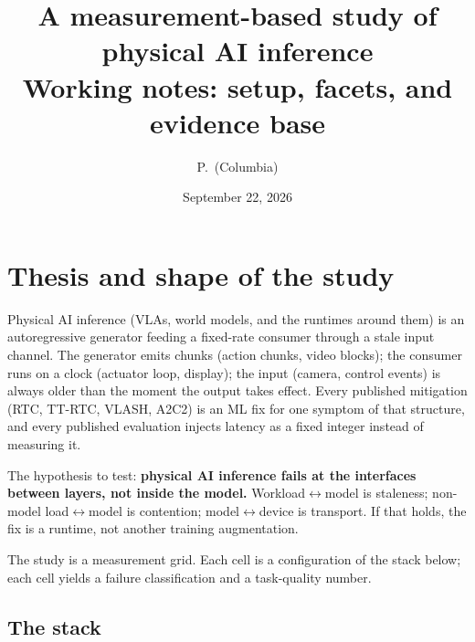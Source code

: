 \documentclass[10pt,letterpaper]{article}
\title{\vspace{-1.2em}A measurement-based study of physical AI inference\\[2pt]\large Working notes: setup, facets, and evidence base}
\author{P.\ (Columbia)}
\date{September 22, 2026}
\begin{document}
\maketitle
\vspace{-1.5em}

\section{Thesis and shape of the study}

Physical AI inference (VLAs, world models, and the runtimes around them) is an autoregressive generator feeding a fixed-rate consumer through a stale input channel. The generator emits chunks (action chunks, video blocks); the consumer runs on a clock (actuator loop, display); the input (camera, control events) is always older than the moment the output takes effect. Every published mitigation (RTC, TT-RTC, VLASH, A2C2) is an ML fix for one symptom of that structure, and every published evaluation injects latency as a fixed integer instead of measuring it.

The hypothesis to test: \textbf{physical AI inference fails at the interfaces between layers, not inside the model.} Workload$\leftrightarrow$model is staleness; non-model load$\leftrightarrow$model is contention; model$\leftrightarrow$device is transport. If that holds, the fix is a runtime, not another training augmentation.

The study is a measurement grid. Each cell is a configuration of the stack below; each cell yields a failure classification and a task-quality number.

\subsection{The stack}
\end{document}
